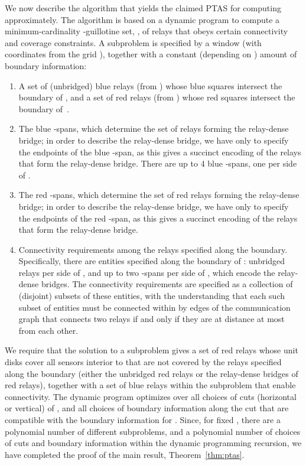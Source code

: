\documentclass[11pt,a4paper]{article}
\theoremstyle{definition}
\theoremstyle{remark}
\begin{document}
\begin{enumerate}
We now describe the algorithm that yields the claimed PTAS for
computing  approximately.  The algorithm is based on a dynamic
program to compute a minimum-cardinality -guillotine set, , of
relays that obeys certain connectivity and coverage constraints.  A
subproblem is specified by a window  (with coordinates from the
grid ), together with a constant (depending on ) amount of boundary information:
\begin{enumerate}
\item A set of  (unbridged) blue relays (from ) whose
  blue squares intersect the boundary of , and a set of  red
  relays (from ) whose red squares intersect the boundary of~.
\item The blue -spans, which determine the set of relays
  forming the relay-dense bridge; in order to describe the relay-dense
  bridge, we have only to specify the endpoints of the blue -span,
  as this gives a succinct encoding of the relays that form the
  relay-dense bridge.  There are up to 4 blue -spans, one per side
  of .
\item The red -spans, which determine the set of red relays
  forming the relay-dense bridge; in order to describe the relay-dense
  bridge, we have only to specify the endpoints of the red -span,
  as this gives a succinct encoding of the relays that form the
  relay-dense bridge.
\item Connectivity requirements among the relays specified along
  the boundary.  Specifically, there are  entities specified
  along the boundary of :  unbridged relays per side of
  , and up to two -spans per side of , which encode the
  relay-dense bridges.  The connectivity requirements are specified as
  a collection of (disjoint) subsets of these  entities, with
  the understanding that each such subset of entities must be
  connected within  by edges of the communication graph that
  connects two relays if and only if they are at distance at most 
  from each other.
\end{enumerate}
We require that the solution to a subproblem gives a set of red relays
whose unit disks cover all sensors interior to  that are not
covered by the relays specified along the boundary (either the 
unbridged red relays or the relay-dense bridges of red relays),
together with a set of blue relays within the subproblem that enable
connectivity.  The dynamic program optimizes over all choices of cuts
 (horizontal or vertical) of , and all choices of boundary
information along the cut  that are compatible with the boundary
information for .  Since, for fixed , there are a polynomial
number of different subproblems, and a polynomial number of choices of
cuts and boundary information within the dynamic programming
recursion, we have completed the proof of the main result, Theorem~\ref{thm:ptas}.


\end{enumerate}
\end{document}
